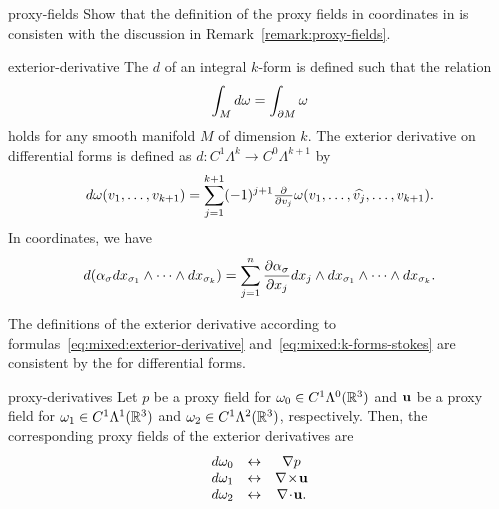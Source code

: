 \begin{Problem}{proxy-fields}
  Show that the definition of the proxy fields in coordinates in
   is consisten with the discussion
  in Remark~\ref{remark:proxy-fields}.
\end{Problem}

\begin{Definition}{exterior-derivative}
  The  $d$ of an integral $k$-form is
  defined such that the relation
  \begin{gather}
    \label{eq:mixed:k-forms-stokes}
    \int_M d\omega = \int_{\partial M} \omega
  \end{gather}
  holds for any smooth manifold $M$ of dimension $k$. The exterior
  derivative on differential forms is defined as
  $d:C^1\Lambda^k \to C^0\Lambda^{k+1}$ by
  \begin{gather}
    \label{eq:mixed:exterior-derivative}
    d\omega(v_1,\dots,v_{k+1})
    = \sum_{j=1}^{k+1} (-1)^{j+1} \tfrac{\partial}{\partial v_j} \omega(v_1,\dots,\widehat{v_j},\dots,v_{k+1}).
  \end{gather}
  In coordinates, we have
  \begin{gather}
    d(\alpha_\sigma dx_{\sigma_1} \wedge\dots\wedge dx_{\sigma_k})
    = \sum_{j=1}^n \frac{\partial \alpha_\sigma}{\partial x_j}
    dx_j \wedge dx_{\sigma_1} \wedge\dots\wedge dx_{\sigma_k}.
  \end{gather}
\end{Definition}

\begin{remark}
  The definitions of the exterior derivative according to
  formulas~\eqref{eq:mixed:exterior-derivative}
  and~\eqref{eq:mixed:k-forms-stokes} are consistent by the
   for differential forms.
\end{remark}

\begin{Lemma}{proxy-derivatives}
  Let $p$ be a proxy field for $\omega_0\in C^1\Lambda^0(\mathbb R^3)$ and
  $\mathbf u$ be a proxy field for $\omega_1\in C^1\Lambda^1(\mathbb R^3)$ and
  $\omega_2\in C^1\Lambda^2(\mathbb R^3)$, respectively. Then, the
  corresponding proxy fields of the exterior derivatives are
  \begin{gather}
    \begin{matrix}
      d\omega_0 & \leftrightarrow & \nabla p\\
      d\omega_1 & \leftrightarrow & \nabla\!\times\! \mathbf u\\
      d\omega_2 & \leftrightarrow & \nabla\!\cdot\! \mathbf u.
    \end{matrix}
  \end{gather}
\end{Lemma}

